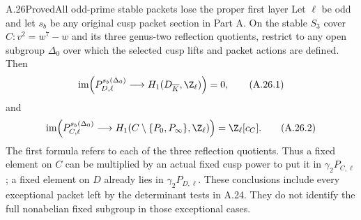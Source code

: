 \begin{statement}{A.26}{Proved}{All odd-prime stable packets lose the proper first layer}
Let $\ell$ be odd and let $s_b$ be any original cusp
packet section in Part A. On the stable $S_3$ cover
$C:v^2=w^7-w$ and its three genus-two reflection
quotients, restrict to any open subgroup $\Delta_0$
over which the selected cusp lifts and packet
actions are defined. Then
\[
 \operatorname{im}\!\left(
    P_{D,\ell}^{s_b(\Delta_0)}
       \longrightarrow H_1(D_{\overline K},\Z_\ell)
                    \right)=0,                         \tag{A.26.1}
\]
and
\[
 \operatorname{im}\!\left(
    P_{C,\ell}^{s_b(\Delta_0)}
       \longrightarrow H_1(C\setminus\{P_0,P_\infty\},
                           \Z_\ell)
                    \right)
              =\Z_\ell[c_C].                           \tag{A.26.2}
\]
The first formula refers to each of the three
reflection quotients. Thus a fixed element on $C$
can be multiplied by an actual fixed cusp power
to put it in $\gamma_2P_{C,\ell}$; a fixed element
on $D$ already lies in $\gamma_2P_{D,\ell}$.
These conclusions include every exceptional packet
left by the determinant tests in A.24.
They do not identify the full nonabelian fixed
subgroup in those exceptional cases.
\end{statement}
